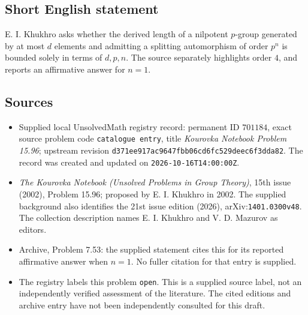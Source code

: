 \documentclass[11pt]{article}
\begin{document}
\subsection{Short English statement}
E. I. Khukhro asks whether the derived length of a nilpotent \(p\)-group generated by at most \(d\) elements and admitting a splitting automorphism of order \(p^n\) is bounded solely in terms of \(d,p,n\). The source separately highlights order \(4\), and reports an affirmative answer for \(n=1\).
\subsection{Sources}
\begin{itemize}
\item Supplied local UnsolvedMath registry record: permanent ID \(701184\), exact source problem code \texttt{catalogue entry}, title \emph{Kourovka Notebook Problem 15.96}; upstream revision \texttt{d371ee917ac9647fbb06cd6fc529deec6f3dda82}. The record was created and updated on \texttt{2026-10-16T14:00:00Z}.
\item \emph{The Kourovka Notebook (Unsolved Problems in Group Theory)}, 15th issue (2002), Problem 15.96; proposed by E. I. Khukhro in 2002. The supplied background also identifies the 21st issue edition (2026), arXiv:\texttt{1401.0300v48}. The collection description names E. I. Khukhro and V. D. Mazurov as editors.
\item Archive, Problem 7.53: the supplied statement cites this for its reported affirmative answer when \(n=1\). No fuller citation for that entry is supplied.
\item The registry labels this problem \texttt{open}. This is a supplied source label, not an independently verified assessment of the literature. The cited editions and archive entry have not been independently consulted for this draft.
\end{itemize}
\end{document}
